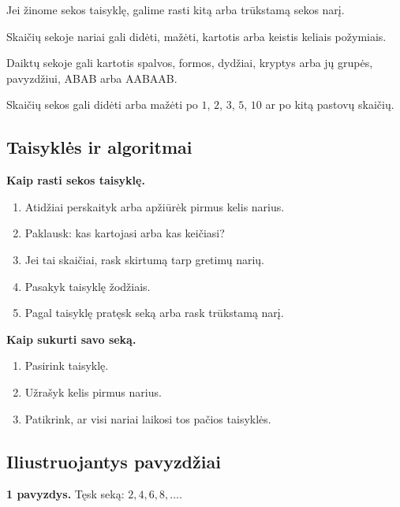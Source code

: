 \begin{savybe}
Jei žinome sekos taisyklę, galime rasti kitą arba trūkstamą sekos narį.
\end{savybe}

\begin{savybe}
Skaičių sekoje nariai gali didėti, mažėti, kartotis arba keistis keliais požymiais.
\end{savybe}

\begin{savybe}
Daiktų sekoje gali kartotis spalvos, formos, dydžiai, kryptys arba jų grupės, pavyzdžiui, ABAB arba AABAAB.
\end{savybe}

\begin{savybe}
Skaičių sekos gali didėti arba mažėti po \(1\), \(2\), \(3\), \(5\), \(10\) ar po kitą pastovų skaičių.
\end{savybe}

\subsection{Taisyklės ir algoritmai}

\textbf{Kaip rasti sekos taisyklę.}
\begin{enumerate}
\item Atidžiai perskaityk arba apžiūrėk pirmus kelis narius.
\item Paklausk: kas kartojasi arba kas keičiasi?
\item Jei tai skaičiai, rask skirtumą tarp gretimų narių.
\item Pasakyk taisyklę žodžiais.
\item Pagal taisyklę pratęsk seką arba rask trūkstamą narį.
\end{enumerate}

\textbf{Kaip sukurti savo seką.}
\begin{enumerate}
\item Pasirink taisyklę.
\item Užrašyk kelis pirmus narius.
\item Patikrink, ar visi nariai laikosi tos pačios taisyklės.
\end{enumerate}

\subsection{Iliustruojantys pavyzdžiai}

\textbf{1 pavyzdys.} Tęsk seką: \(2,4,6,8,\ldots\).

